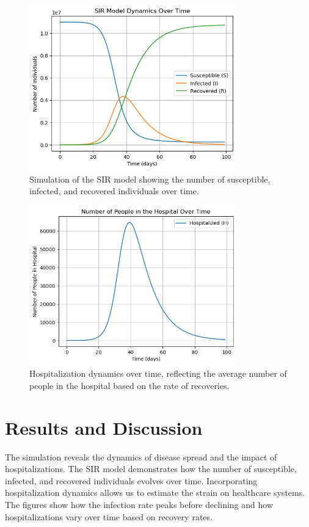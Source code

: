 \documentclass{article}
\begin{document}
\begin{figure}[h!]
\centering
\includegraphics[width=0.8\textwidth]{sir_model_simulation.png}
\caption{Simulation of the SIR model showing the number of susceptible, infected, and recovered individuals over time.}
\end{figure}

\begin{figure}[h!]
\centering
\includegraphics[width=0.8\textwidth]{hospitalization_dynamics.png}
\caption{Hospitalization dynamics over time, reflecting the average number of people in the hospital based on the rate of recoveries.}
\end{figure}

\section{Results and Discussion}
The simulation reveals the dynamics of disease spread and the impact of hospitalizations. The SIR model demonstrates how the number of susceptible, infected, and recovered individuals evolves over time. Incorporating hospitalization dynamics allows us to estimate the strain on healthcare systems. The figures show how the infection rate peaks before declining and how hospitalizations vary over time based on recovery rates.
\end{document}
